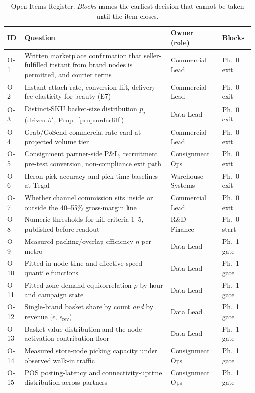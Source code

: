 \begin{table}[t]
\caption{Open Items Register. \emph{Blocks} names the earliest decision that cannot be taken until the item closes.}
\label{tab:open}
\centering\footnotesize
\begin{tabular}{@{}p{0.5cm}p{4.0cm}p{1.5cm}p{1.0cm}@{}}
\toprule
\textbf{ID} & \textbf{Question} & \textbf{Owner (role)} & \textbf{Blocks}\\
\midrule
O-1 & Written marketplace confirmation that seller-fulfilled instant from brand nodes is permitted, and courier terms & Commercial Lead & Ph.\ 0 exit\\
O-2 & Instant attach rate, conversion lift, delivery-fee elasticity for beauty (E7) & Commercial Lead & Ph.\ 0 exit\\
O-3 & Distinct-SKU basket-size distribution $p_j$ (drives $\beta^\star$, Prop.~\ref{prop:orderfill}) & Data Lead & Ph.\ 0 exit\\
O-4 & Grab/GoSend commercial rate card at projected volume tier & Commercial Lead & Ph.\ 0 exit\\
O-5 & Consignment partner-side P\&L, recruitment pre-test conversion, non-compliance exit path & Consignment Ops & Ph.\ 0 exit\\
O-6 & Heron pick-accuracy and pick-time baselines at Tegal & Warehouse Systems & Ph.\ 0 exit\\
O-7 & Whether channel commission sits inside or outside the 40--55\% gross-margin line & Commercial Lead & Ph.\ 0 exit\\
O-8 & Numeric thresholds for kill criteria 1--5, published before readout & R\&D + Finance & Ph.\ 0 start\\
\midrule
O-9 & Measured packing/overlap efficiency $\eta$ per metro & Data Lead & Ph.\ 1 gate\\
O-10 & Fitted in-node time and effective-speed quantile functions & Data Lead & Ph.\ 1 gate\\
O-11 & Fitted zone-demand equicorrelation $\rho$ by hour and campaign state & Data Lead & Ph.\ 1 gate\\
O-12 & Single-brand basket share by count \emph{and} by revenue ($\epsilon$, $\epsilon_{\mathrm{rev}}$) & Data Lead & Ph.\ 1 gate\\
O-13 & Basket-value distribution and the node-activation contribution floor & Data Lead & Ph.\ 1 gate\\
O-14 & Measured store-node picking capacity under observed walk-in traffic & Consignment Ops & Ph.\ 1 gate\\
O-15 & POS posting-latency and connectivity-uptime distribution across partners & Consignment Ops & Ph.\ 1 gate\\

\end{tabular}
\end{table}
